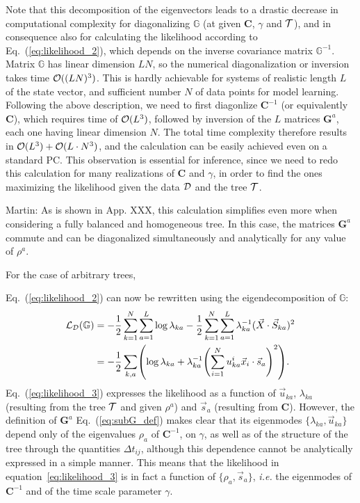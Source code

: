 \documentclass[preprint,amsmath,amssymb,superscriptaddress,showpacs,pre]{revtex4-1}
\let\originalleft\left
\let\originalright\right
\renewcommand{\left}{\mathopen{}\mathclose\bgroup\originalleft}
\renewcommand{\right}{\aftergroup\egroup\originalright}
\def\vx{\vec x}
\newcommand{\iC}{\bm{C}^{-1}}
\newcommand{\vsa}{\vec{s}_a}
\newcommand{\vuka}{\vec{u}_{ka}}
\newcommand{\martin}[1]{{\color{blue}Martin: #1}}
\begin{document}
Note that this decomposition of the eigenvectors leads to a drastic decrease in computational complexity for diagonalizing $\mathbb{G}$ (at given $\bm C$, $\gamma$ and $\cal T$), and in consequence also for calculating the likelihood according to Eq.~(\ref{eq:likelihood_2}), which depends on the inverse covariance matrix $\mathbb{G}^{-1}$. Matrix $\mathbb{G}$ has linear dimension $LN$, so the numerical diagonalization or inversion takes time ${\cal O}( (L N)^3)$. This is hardly achievable for systems of realistic length $L$ of the state vector, and sufficient number $N$ of data points for model learning. Following the above description, we need to first diagonlize $\bm C^{-1}$ (or equivalently $\bm C$), which requires time of ${\cal O}(L^3)$, followed by inversion of the $L$ matrices ${\bm G}^a$, each one having linear dimension $N$. The total time complexity therefore results in ${\cal O}(L^3) + {\cal O}(L\cdot N^3)$, and the calculation can be easily achieved even on a standard PC. This observation is essential for inference, since we need to redo this calculation for many realizations of $\bm C$ and $\gamma$, in order to find the ones maximizing the likelihood given the data $\cal D$ and the tree $\cal T$. \martin{As is shown in App. XXX, this calculation simplifies even more when considering a fully balanced and homogeneous tree. In this case, the matrices $\bm G^a$ commute and can be diagonalized simultaneously and analytically for any value of $\rho^a$.

For the case of arbitrary trees, }Eq.~(\ref{eq:likelihood_2}) can now be rewritten using the eigendecomposition of $\mathbb{G}$: 
\begin{equation}
	\begin{split}
		\mathcal{L}_{\mathcal{D}}(\mathbb{G}) &= -\frac 1 2 \sum_{k=1}^N\sum_{a=1}^L \log\lambda_{ka} - \frac 1 2 \sum_{k=1}^N\sum_{a=1}^L \lambda_{ka}^{-1}(\vec{X}\cdot \vec{S}_{ka})^2\\
		&= -\frac 1 2 \sum_{k,a} \left(\log\lambda_{ka} + \lambda_{ka}^{-1}	\left(\sum_{i=1}^N u_{ka}^i\vx_i\cdot\vsa\right)^2 \right).
	\end{split}
	\label{eq:likelihood_3}
\end{equation}
Eq.~(\ref{eq:likelihood_3}) expresses the likelihood as a function of $\vuka$, $\lambda_{ka}$ (resulting from the tree $\cal T$ and given $\rho^a$) and $\vsa$ (resulting from $\bm C$). 
However, the definition of $\bm G^a$ Eq.~(\ref{eq:subG_def}) makes clear that its eigenmodes $\{\lambda_{ka}, \vuka \}$ depend only of the eigenvalues $\rho_a$ of $\iC$, on $\gamma$, as well as of the structure of the tree through the quantities $\Delta t_{ij}$, although this dependence cannot be analytically expressed in a simple manner. 
This means that the likelihood in equation~\ref{eq:likelihood_3} is in fact a function of $\{\rho_a, \vsa\}$, \emph{i.e.} the eigenmodes of $\iC$ and of the time scale parameter $\gamma$.
\end{document}

